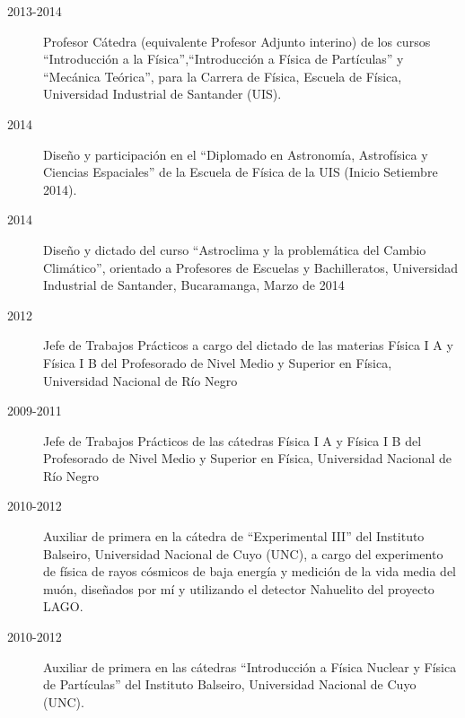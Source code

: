 \begin{description}
	\item [2013-2014] Profesor Cátedra (equivalente Profesor Adjunto interino) de los cursos ``Introducción a la Física'',``Introducción a Física de Partículas'' y ``Mecánica Teórica'', para la Carrera de Física, Escuela de Física, Universidad Industrial de Santander (UIS).
    \item [2014] Diseño y participación en el ``Diplomado en Astronomía, Astrofísica y Ciencias Espaciales'' de la Escuela de Física de la UIS (Inicio Setiembre 2014).
	\item [2014] Diseño y dictado del curso ``Astroclima y la problemática del Cambio Climático'', orientado a Profesores de Escuelas y Bachilleratos, Universidad Industrial de Santander, Bucaramanga, Marzo de 2014
	\item [2012] Jefe de Trabajos Prácticos a cargo del dictado de las materias Física I A y Física I B del Profesorado de Nivel Medio y Superior en Física, Universidad Nacional de Río Negro
	\item [2009-2011] Jefe de Trabajos Prácticos de las cátedras Física I A y Física I B del Profesorado de Nivel Medio y Superior en Física, Universidad Nacional de Río Negro
	\item [2010-2012] Auxiliar de primera en la cátedra de ``Experimental III'' del Instituto Balseiro, Universidad Nacional de Cuyo (UNC), a cargo del experimento de física de rayos cósmicos de baja energía y medición de la vida media del muón, diseñados por mí y utilizando el detector Nahuelito del proyecto LAGO.
	\item [2010-2012] Auxiliar de primera en las cátedras ``Introducción a Física Nuclear y Física de Partículas'' del Instituto Balseiro, Universidad Nacional de Cuyo (UNC).
\fi
\end{description}
\fi
